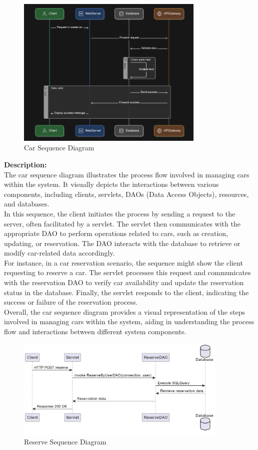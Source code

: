 \begin{figure}[h]
\centering
\includegraphics[width=0.8\textwidth, inner]{sections/BLL/CarSequenceDiagram.png}
\caption{Car Sequence Diagram}
\label{fig:figure2}
\end{figure}
\textbf{Description:}\\
The car sequence diagram illustrates the process flow involved in managing cars within the system. It visually depicts the interactions between various components, including clients, servlets, DAOs (Data Access Objects), resources, and databases.\\
In this sequence, the client initiates the process by sending a request to the server, often facilitated by a servlet. The servlet then communicates with the appropriate DAO to perform operations related to cars, such as creation, updating, or reservation. The DAO interacts with the database to retrieve or modify car-related data accordingly.\\
For instance, in a car reservation scenario, the sequence might show the client requesting to reserve a car. The servlet processes this request and communicates with the reservation DAO to verify car availability and update the reservation status in the database. Finally, the servlet responds to the client, indicating the success or failure of the reservation process.\\
Overall, the car sequence diagram provides a visual representation of the steps involved in managing cars within the system, aiding in understanding the process flow and interactions between different system components.\newpage
\begin{figure}[h]
\centering
\includegraphics[width=0.9\textwidth, inner]{sections//BLL/Reserve-Sequence-diagram.png}
\caption{Reserve Sequence Diagram}
\label{fig:figure2}
\end{figure}

